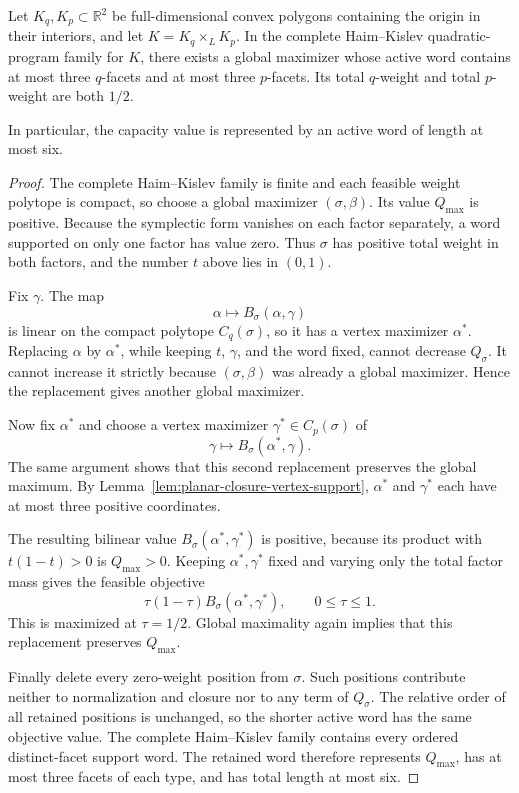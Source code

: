 \begin{theorem}
\label{thm:product-qp-six-facet-maximizer}
Let \(K_q,K_p\subset\mathbb R^2\) be full-dimensional convex polygons
containing the origin in their interiors, and let
\(K=K_q\times_LK_p\).
In the complete Haim--Kislev quadratic-program family for \(K\), there exists
a global maximizer whose active word contains at most three \(q\)-facets and
at most three \(p\)-facets.  Its total \(q\)-weight and total \(p\)-weight are
both \(1/2\).

In particular, the capacity value is represented by an active word of length
at most six.
\end{theorem}

\begin{proof}
The complete Haim--Kislev family is finite and each feasible weight polytope is
compact, so choose a global maximizer \((\sigma,\beta)\).
Its value \(Q_{\max}\) is positive.  Because the symplectic form vanishes on
each factor separately, a word supported on only one factor has value zero.
Thus \(\sigma\) has positive total weight in both factors, and the number
\(t\) above lies in \((0,1)\).

Fix \(\gamma\).  The map
\[
  \alpha\longmapsto B_\sigma(\alpha,\gamma)
\]
is linear on the compact polytope \(C_q(\sigma)\), so it has a vertex
maximizer \(\alpha^\ast\).  Replacing \(\alpha\) by \(\alpha^\ast\), while
keeping \(t\), \(\gamma\), and the word fixed, cannot decrease \(Q_\sigma\).
It cannot increase it strictly because \((\sigma,\beta)\) was already a
global maximizer.  Hence the replacement gives another global maximizer.

Now fix \(\alpha^\ast\) and choose a vertex maximizer
\(\gamma^\ast\in C_p(\sigma)\) of
\[
  \gamma\longmapsto B_\sigma(\alpha^\ast,\gamma).
\]
The same argument shows that this second replacement preserves the global
maximum.  By Lemma~\ref{lem:planar-closure-vertex-support},
\(\alpha^\ast\) and \(\gamma^\ast\) each have at most three positive
coordinates.

The resulting bilinear value
\(B_\sigma(\alpha^\ast,\gamma^\ast)\) is positive, because its product with
\(t(1-t)>0\) is \(Q_{\max}>0\).  Keeping
\(\alpha^\ast,\gamma^\ast\) fixed and varying only the total factor mass gives
the feasible objective
\[
  \tau(1-\tau)B_\sigma(\alpha^\ast,\gamma^\ast),
  \qquad 0\leq\tau\leq1.
\]
This is maximized at \(\tau=1/2\).  Global maximality again implies that this
replacement preserves \(Q_{\max}\).

Finally delete every zero-weight position from \(\sigma\).  Such positions
contribute neither to normalization and closure nor to any term of
\(Q_\sigma\).  The relative order of all retained positions is unchanged, so
the shorter active word has the same objective value.  The complete
Haim--Kislev family contains every ordered distinct-facet support word.
The retained word therefore represents \(Q_{\max}\), has at most three facets
of each type, and has total length at most six.
\end{proof}

